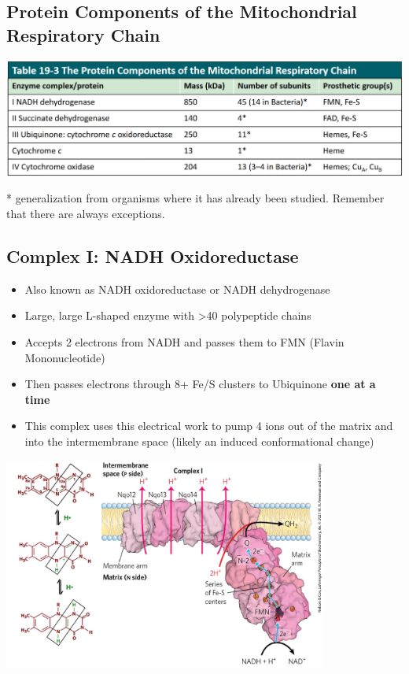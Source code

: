 \documentclass[10pt]{article}
\newcommand{\proton}{\text{H$^+$}}
\begin{document}
\subsection*{Protein Components of the Mitochondrial Respiratory Chain}
\begin{center} 
	\includegraphics*[width=\textwidth]{L2_3.png}
\end{center}
* generalization from organisms where it has already been studied.  Remember that there are always exceptions.

\subsection*{Complex I: NADH Oxidoreductase}
\begin{itemize}
	\item Also known as NADH oxidoreductase or NADH dehydrogenase
	\item Large, large L-shaped enzyme with >40 polypeptide chains
	\item Accepts 2 electrons from NADH and passes them to FMN (Flavin Mononucleotide)
	\item Then passes electrons through 8+ Fe/S clusters to Ubiquinone \textbf{one at a time}
	\item This complex uses this electrical work to pump 4 \proton ions out of the matrix and into the intermembrane space (likely an induced conformational change)
\end{itemize}
\begin{center} 
	\includegraphics*[width=0.8\textwidth]{L2_4.png}
\end{center}
\end{document}
